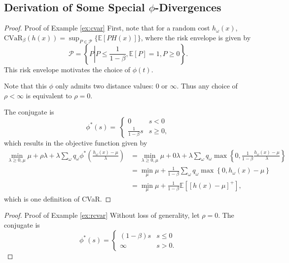 \documentclass[opre,nonblindrev]{informs3} %
\newcommand{\E}{\mathbb{E}}
\newcommand{\e}[1]{\E \left[ #1 \right]}
\begin{document}
%
\begin{APPENDICES}

\section{Derivation of Some Special $\phi$-Divergences}

\begin{proof}{\sc Proof of Example \ref{ex:cvar}}
	First, note that for a random cost $h_\omega(x)$, $\mbox{CVaR}_\beta(h(x)) = \sup_{P \in \mathcal{P}} \{\e{PH(x)}\}$, where the risk envelope is given by
	\[
		\mathcal{P} = \left\{ P \left| P \leq \frac{1}{1-\beta}, \e{P} = 1, P \geq 0 \right.\right\}.
	\]
	This risk envelope motivates the choice of $\phi(t)$.
	
	Note that this $\phi$ only admits two distance values: $0$ or $\infty$.
	Thus any choice of $\rho < \infty$ is equivalent to $\rho = 0$.
	
	The conjugate is
	\[
	\phi^*(s) = \
		\begin{cases}
			0 & s < 0 \\
			\frac{1}{1-\beta} s & s \geq 0,
		\end{cases}
	\]
	which results in the objective function given by
	\begin{align*}
		\min_{\lambda \geq 0,\mu} \mu + \rho \lambda + \lambda \sum_\omega q_\omega \phi^*\left( \frac{h_\omega(x)-\mu}{\lambda} \right) & = \min_{\lambda \geq 0, \mu} \mu + 0\lambda + \lambda \sum_\omega q_\omega \max\left\{ 0, \frac{1}{1-\beta} \frac{h_\omega(x)-\mu}{\lambda} \right\} \\
		& = \min_{\mu} \mu + \frac{1}{1-\beta} \sum_\omega q_\omega \max\left\{ 0, h_\omega(x)-\mu \right\} \\
		& = \min_{\mu} \mu + \frac{1}{1-\beta} \e{[h(x)-\mu]^+},
	\end{align*}
	which is one definition of CVaR.
\end{proof}

\begin{proof}{\sc Proof of Example \ref{ex:rcvar}}
	Without loss of generality, let $\rho = 0$.
	The conjugate is
	\[
		\phi^*(s) =
		\begin{cases}
			(1-\beta) s & s \leq 0 \\
			\infty & s > 0.
		\end{cases}
	\]
	

\end{proof}
\end{APPENDICES}
\end{document}

